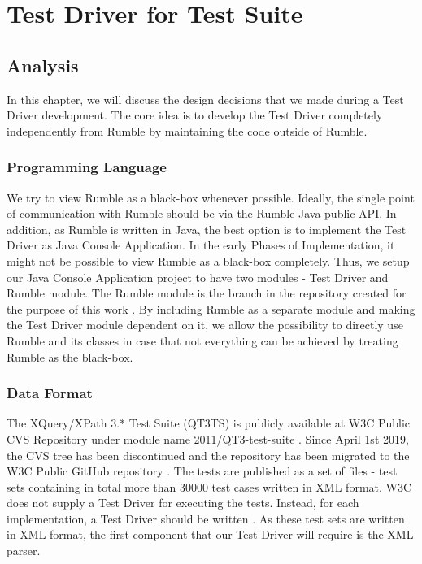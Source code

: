 \chapter{Test Driver for Test Suite}
\section{Analysis}
In this chapter, we will discuss the design decisions that we made during a Test Driver development. The core idea is to develop the Test Driver completely independently from Rumble by maintaining the code outside of Rumble.

\vspace{-1mm}
\subsection{Programming Language}
We try to view Rumble as a black-box whenever possible. Ideally, the single point of communication with Rumble should be via the Rumble Java public API. In addition, as Rumble is written in Java, the best option is to implement the Test Driver as Java Console Application. In the early Phases of Implementation, it might not be possible to view Rumble as a black-box completely. Thus, we setup our Java Console Application project to have two modules - Test Driver and Rumble module. The Rumble module is the branch in the repository created for the purpose of this work \cite{RumbleBranch}. By including Rumble as a separate module and making the Test Driver module dependent on it, we allow the possibility to directly use Rumble and its classes in case that not everything can be achieved by treating Rumble as the black-box. 

\vspace{-1mm}
\subsection{Data Format}
The XQuery/XPath 3.* Test Suite (QT3TS) is publicly available at W3C Public CVS Repository under module name 2011/QT3-test-suite \cite{TestSuiteCVSRepository}. Since April 1st 2019, the CVS tree has been discontinued and the repository has been migrated to the W3C Public GitHub repository \cite{TestSuiteGitHubRepository}. The tests are published as a set of files - test sets containing in total more than 30000 test cases written in XML format. W3C does not supply a Test Driver for executing the tests. Instead, for each implementation, a Test Driver should be written \cite{TestSuite}. As these test sets are written in XML format, the first component that our Test Driver will require is the XML parser. 

